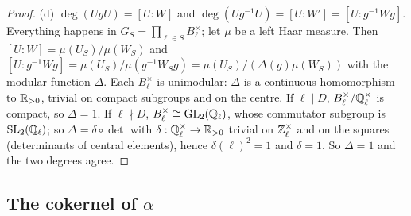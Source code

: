 \begin{proof}
(d) $\deg(UgU)=[U:W]$ and $\deg(Ug^{-1}U)=[U:W']=[U:g^{-1}Wg]$. Everything happens in $G_S=\prod_{\ell\in S}B_\ell^\times$; let $\mu$ be a left Haar measure. Then
$[U:W]=\mu(U_S)/\mu(W_S)$ and $[U:g^{-1}Wg]=\mu(U_S)/\mu(g^{-1}W_Sg)=\mu(U_S)/(\Delta(g)\mu(W_S))$ with the modular function $\Delta$. Each $B_\ell^\times$ is
unimodular: $\Delta$ is a continuous homomorphism to $\mathbb{R}_{>0}$, trivial on compact subgroups and on the centre. If $\ell\mid D$, $B_\ell^\times/\mathbb{Q}_\ell^\times$ is
compact, so $\Delta=1$. If $\ell\nmid D$, $B_\ell^\times\cong\mathrm{GL}_2(\mathbb{Q}_\ell)$, whose commutator subgroup is $\mathrm{SL}_2(\mathbb{Q}_\ell)$; so $\Delta=\delta\circ\det$ with
$\delta:\mathbb{Q}_\ell^\times\to\mathbb{R}_{>0}$ trivial on $\mathbb{Z}_\ell^\times$ and on the squares (determinants of central elements), hence $\delta(\ell)^2=1$ and $\delta=1$. So
$\Delta=1$ and the two degrees agree.
\end{proof}

\subsection{The cokernel of \texorpdfstring{$\alpha$}{alpha}}

